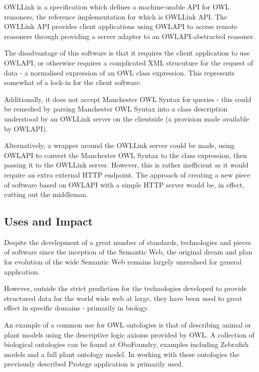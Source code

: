 \documentclass{article}
\begin{document}
OWLLink is a specification which defines a machine-usable API for OWL reasoners,
the reference implementation for which is OWLLink API. The OWLLink API provides
client applications using OWLAPI to access remote reasoners through providing a
server adapter to an OWLAPI-abstracted reasoner. 

The disadvantage of this software is that it requires the client application
to use OWLAPI, or otherwise requires a complicated XML strucuture for the
request of data - a normalised expression of an OWL class expression. This
represents somewhat of a lock-in for the client software. 

Additionally, it does not accept Manchester OWL Syntax for queries - this could 
be remedied by parsing Manchester OWL Syntax into a class description understood 
by an OWLLink server on the clientside (a provision made available by OWLAPI).

Alternatively, a wrapper around the OWLLink server could be made, using OWLAPI
to convert the Manchester OWL Syntax to the class expression, then passing it to
the OWLLink server. However, this is rather inefficient as it would require an
extra external HTTP endpoint. The approach of creating a new piece of software 
based on OWLAPI with a simple HTTP server would be, in effect, cutting out the 
middleman.

\subsection{Uses and Impact}

Despite the development of a great number of standards, technologies and pieces
of software since the inception of the Semantic Web, the original
dream and plan for evolution of the wide Semantic Web remains largely unrealised
for general application.\cite{semweb}

However, outside the strict prediction for the technologies developed to provide
structured data for the world wide web at large, they have been used to great
effect in specific domains - primarily in biology.

An example of a common use for OWL ontologies is that of describing animal or
plant models using the descriptive logic axioms provided by OWL. A collection 
of biological ontologies can be found at OboFoundry\cite{obofoundry}, examples
including Zebrafish models and a full plant ontology model. In working with
these ontologies the previously described Protege application is primarily used. 
\end{document}

